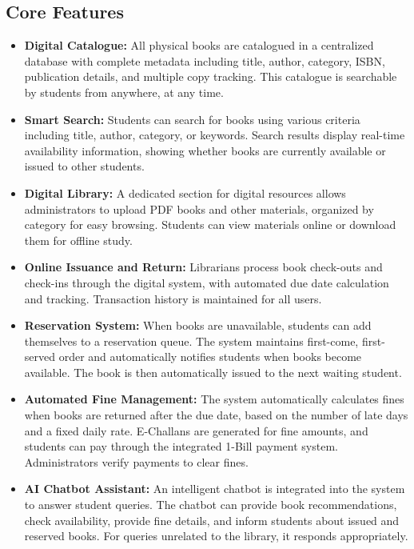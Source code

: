 \documentclass[12pt,a4paper]{report}
\begin{document}
\subsection{Core Features}
\begin{itemize} 

   \item \textbf{Digital Catalogue:} All physical books are catalogued in a centralized database with complete metadata including title, author, category, ISBN, publication details, and multiple copy tracking. This catalogue is searchable by students from anywhere, at any time.

   \item \textbf{Smart Search:} Students can search for books using various criteria including title, author, category, or keywords. Search results display real-time availability information, showing whether books are currently available or issued to other students.

   \item \textbf{Digital Library:} A dedicated section for digital resources allows administrators to upload PDF books and other materials, organized by category for easy browsing. Students can view materials online or download them for offline study.

   \item \textbf{Online Issuance and Return:} Librarians process book check-outs and check-ins through the digital system, with automated due date calculation and tracking. Transaction history is maintained for all users.

   \item \textbf{Reservation System:} When books are unavailable, students can add themselves to a reservation queue. The system maintains first-come, first-served order and automatically notifies students when books become available. The book is then automatically issued to the next waiting student.

   \item \textbf{Automated Fine Management:} The system automatically calculates fines when books are returned after the due date, based on the number of late days and a fixed daily rate. E-Challans are generated for fine amounts, and students can pay through the integrated 1-Bill payment system. Administrators verify payments to clear fines.

   \item \textbf{AI Chatbot Assistant:} An intelligent chatbot is integrated into the system to answer student queries. The chatbot can provide book recommendations, check availability, provide fine details, and inform students about issued and reserved books. For queries unrelated to the library, it responds appropriately.
   

\end{itemize}
\end{document}
